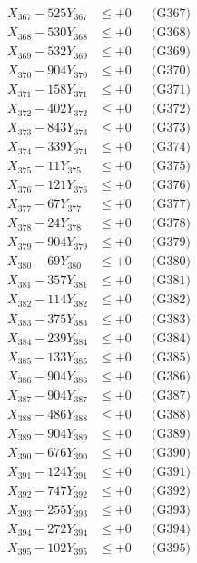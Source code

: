 \documentclass[a4paper,10pt]{article}
\begin{document}
{\begin{align}
X_{367} - 525Y_{367} &\leq +0 && \text{(G367)} \\
X_{368} - 530Y_{368} &\leq +0 && \text{(G368)} \\
X_{369} - 532Y_{369} &\leq +0 && \text{(G369)} \\
X_{370} - 904Y_{370} &\leq +0 && \text{(G370)} \\
\allowbreak
X_{371} - 158Y_{371} &\leq +0 && \text{(G371)} \\
X_{372} - 402Y_{372} &\leq +0 && \text{(G372)} \\
X_{373} - 843Y_{373} &\leq +0 && \text{(G373)} \\
X_{374} - 339Y_{374} &\leq +0 && \text{(G374)} \\
X_{375} - 11Y_{375} &\leq +0 && \text{(G375)} \\
X_{376} - 121Y_{376} &\leq +0 && \text{(G376)} \\
X_{377} - 67Y_{377} &\leq +0 && \text{(G377)} \\
X_{378} - 24Y_{378} &\leq +0 && \text{(G378)} \\
X_{379} - 904Y_{379} &\leq +0 && \text{(G379)} \\
X_{380} - 69Y_{380} &\leq +0 && \text{(G380)} \\
\allowbreak
X_{381} - 357Y_{381} &\leq +0 && \text{(G381)} \\
X_{382} - 114Y_{382} &\leq +0 && \text{(G382)} \\
X_{383} - 375Y_{383} &\leq +0 && \text{(G383)} \\
X_{384} - 239Y_{384} &\leq +0 && \text{(G384)} \\
X_{385} - 133Y_{385} &\leq +0 && \text{(G385)} \\
X_{386} - 904Y_{386} &\leq +0 && \text{(G386)} \\
X_{387} - 904Y_{387} &\leq +0 && \text{(G387)} \\
X_{388} - 486Y_{388} &\leq +0 && \text{(G388)} \\
X_{389} - 904Y_{389} &\leq +0 && \text{(G389)} \\
X_{390} - 676Y_{390} &\leq +0 && \text{(G390)} \\
\allowbreak
X_{391} - 124Y_{391} &\leq +0 && \text{(G391)} \\
X_{392} - 747Y_{392} &\leq +0 && \text{(G392)} \\
X_{393} - 255Y_{393} &\leq +0 && \text{(G393)} \\
X_{394} - 272Y_{394} &\leq +0 && \text{(G394)} \\
X_{395} - 102Y_{395} &\leq +0 && \text{(G395)} \\

\end{align}}
\end{document}
